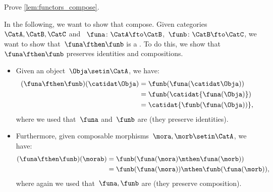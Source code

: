 \begin{exercise}
    Prove \cref{lem:functors_compose}.
\end{exercise}
\begin{solution}
    In the following, we want to show that  compose.
    Given categories~$\CatA,\CatB,\CatC$ and ~$\funa\colon \CatA\fto \CatB$,~$\funb \colon \CatB\fto \CatC$, we want to show that~$\funa\fthen\funb$ is a .
    To do this, we show that~$\funa\fthen\funb$ preserves identities and compositions.
    \begin{itemize}
        \item Given an object~$\Obja\setin \CatA$, we have:
              \begin{equation}
                  \begin{aligned}
                      (\funa\fthen\funb)(\catidat\Obja)
                       & =\funb(\funa(\catidat\Obja)) \\
                       & =\funb(\catidat{\funa(\Obja)}) \\
                       & =\catidat{\funb(\funa(\Obja))},
                  \end{aligned}
              \end{equation}
              where we used that~$\funa$ and~$\funb$ are  (they preserve identities).
        \item Furthermore, given composable morphisms~$\mora,\morb\setin \CatA$, we have:
              \begin{equation}
                  \begin{aligned}
                      (\funa\fthen\funb)(\morab)
                       & =\funb(\funa(\mora)\mthen \funa(\morb)) \\
                       & =\funb(\funa(\mora))\mthen \funb(\funa(\morb)),
                  \end{aligned}
              \end{equation}
              where again we used that~$\funa,\funb$ are  (they preserve composition).
    \end{itemize}
\end{solution}


